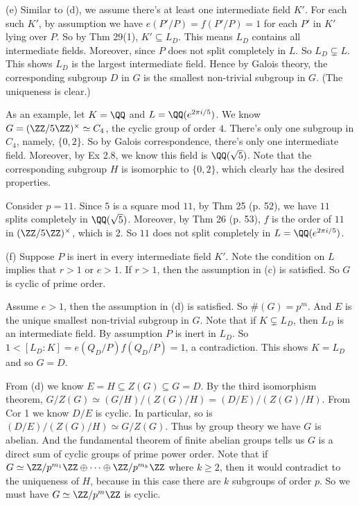 \documentclass[../Chapter.tex]{subfiles}
\begin{document}
(e) Similar to (d), we assume there's at least one intermediate field $K'$. For each such $K'$, by assumption we have $e(P'/P)=f(P'/P)=1$ for each $P'$ in $K'$ lying over $P$. So by Thm 29(1), $K'\subseteq L_D$. This means $L_D$ contains all intermediate fields. Moreover, since $P$ does not split completely in $L$. So $L_D\varsubsetneq L$. This shows $L_D$ is the largest intermediate field. Hence by Galois theory, the corresponding subgroup $D$ in $G$ is the smallest non-trivial subgroup in $G$. (The uniqueness is clear.)

As an example, let $K=\QQ$ and $L=\QQ(e^{2\pi i/5})$. We know $G=(\ZZ/5\ZZ)^\times\simeq C_4$, the cyclic group of order $4$. There's only one subgroup in $C_4$, namely, $\{0,2\}$. So by Galois correspondence, there's only one intermediate field. Moreover, by Ex 2.8, we know this field is $\QQ(\sqrt{5})$. Note that the corresponding subgroup $H$ is isomorphic to $\{0,2\}$, which clearly has the desired properties.

Consider $p=11$. Since $5$ is a square mod $11$, by Thm 25 (p. 52), we have $11$ splits completely in $\QQ(\sqrt{5})$. Moreover, by Thm 26 (p. 53), $f$ is the order of $11$ in $(\ZZ/5\ZZ)^\times$, which is $2$. So $11$ does not split completely in $L=\QQ(e^{2\pi i/5})$.

(f) Suppose $P$ is inert in every intermediate field $K'$. Note the condition on $L$ implies that $r>1$ or $e>1$. If $r>1$, then the assumption in (c) is satisfied. So $G$ is cyclic of prime order.

Assume $e>1$, then the assumption in (d) is satisfied. So $\#(G)=p^m$. And $E$ is the unique smallest non-trivial subgroup in $G$. Note that if $K\varsubsetneq L_D$, then $L_D$ is an intermediate field. By assumption $P$ is inert in $L_D$. So $1<[L_D:K]=e(Q_D/P)f(Q_D/P)=1$, a contradiction. This shows $K=L_D$ and so $G=D$.

From (d) we know $E=H\subseteq Z(G)\subseteq G=D$. By the third isomorphism theorem, $G/Z(G) \simeq (G/H)/(Z(G)/H) = (D/E)/(Z(G)/H)$. From Cor 1 we know  $D/E$ is cyclic. In particular, so is $(D/E)/(Z(G)/H)\simeq G/Z(G)$. Thus by group theory we have $G$ is abelian. And the fundamental theorem of finite abelian groups tells us $G$ is a direct sum of cyclic groups of prime power order. Note that if $G\simeq \ZZ/p^{m_1}\ZZ\oplus\cdots\oplus\ZZ/p^{m_k}\ZZ$ where $k\geq 2$, then it would contradict to the uniqueness of $H$, because in this case there are $k$ subgroups of order $p$. So we must have $G\simeq \ZZ/p^m\ZZ$ is cyclic.
\end{document}

